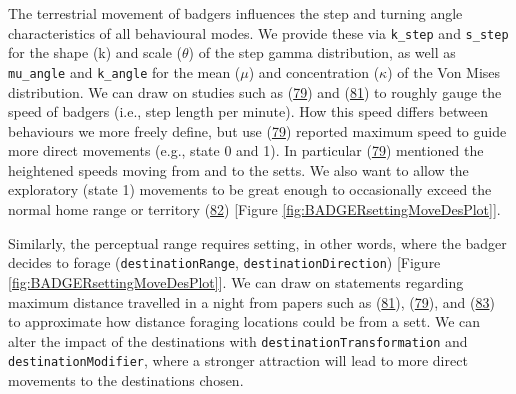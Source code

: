 \documentclass[10pt,a4paper]{article}
\begin{document}
The terrestrial movement of badgers influences the step and turning angle characteristics of all behavioural modes.
We provide these via \texttt{k\_step} and \texttt{s\_step} for the shape (k) and scale (\(\theta\)) of the step gamma distribution, as well as \texttt{mu\_angle} and \texttt{k\_angle} for the mean (\(\mu\)) and concentration (\(\kappa\)) of the Von Mises distribution.
We can draw on studies such as (\protect\hyperlink{ref-kowalczyk_daily_2006}{79}) and (\protect\hyperlink{ref-rosalino_activity_2005}{81}) to roughly gauge the speed of badgers (i.e., step length per minute).
How this speed differs between behaviours we more freely define, but use (\protect\hyperlink{ref-kowalczyk_daily_2006}{79}) reported maximum speed to guide more direct movements (e.g., state 0 and 1).
In particular (\protect\hyperlink{ref-kowalczyk_daily_2006}{79}) mentioned the heightened speeds moving from and to the setts.
We also want to allow the exploratory (state 1) movements to be great enough to occasionally exceed the normal home range or territory (\protect\hyperlink{ref-kelly_extra_2020}{82}) {[}Figure \ref{fig:BADGERsettingMoveDesPlot}{]}.

Similarly, the perceptual range requires setting, in other words, where the badger decides to forage (\texttt{destinationRange}, \texttt{destinationDirection}) {[}Figure \ref{fig:BADGERsettingMoveDesPlot}{]}.
We can draw on statements regarding maximum distance travelled in a night from papers such as (\protect\hyperlink{ref-rosalino_activity_2005}{81}), (\protect\hyperlink{ref-kowalczyk_daily_2006}{79}), and (\protect\hyperlink{ref-loureiro_path_2007}{83}) to approximate how distance foraging locations could be from a sett.
We can alter the impact of the destinations with \texttt{destinationTransformation} and \texttt{destinationModifier}, where a stronger attraction will lead to more direct movements to the destinations chosen.
\end{document}
